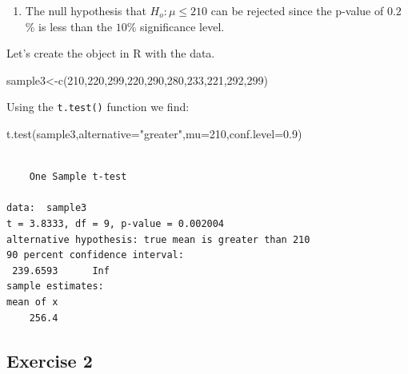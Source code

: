 \documentclass[
  letterpaper,
  DIV=11,
  numbers=noendperiod]{scrreprt}
\newenvironment{Shaded}{\begin{snugshade}}{\end{snugshade}}
\newcommand{\AttributeTok}[1]{\textcolor[rgb]{0.40,0.45,0.13}{#1}}
\newcommand{\DecValTok}[1]{\textcolor[rgb]{0.68,0.00,0.00}{#1}}
\newcommand{\FloatTok}[1]{\textcolor[rgb]{0.68,0.00,0.00}{#1}}
\newcommand{\FunctionTok}[1]{\textcolor[rgb]{0.28,0.35,0.67}{#1}}
\newcommand{\NormalTok}[1]{\textcolor[rgb]{0.00,0.23,0.31}{#1}}
\newcommand{\OtherTok}[1]{\textcolor[rgb]{0.00,0.23,0.31}{#1}}
\newcommand{\StringTok}[1]{\textcolor[rgb]{0.13,0.47,0.30}{#1}}
\providecommand{\tightlist}{%
  \setlength{\itemsep}{0pt}\setlength{\parskip}{0pt}}\usepackage{longtable,booktabs,array}
\begin{document}
\begin{blackbox}

\begin{enumerate}
\def\labelenumi{\arabic{enumi}.}
\setcounter{enumi}{2}
\tightlist
\item
  The null hypothesis that \(H_{o}: \mu \leq 210\) can be rejected since
  the p-value of \(0.2\)\% is less than the \(10\)\% significance level.
\end{enumerate}

\end{blackbox}

Let's create the object in R with the data.

\begin{Shaded}
\begin{Highlighting}[numbers=left,,]
\NormalTok{sample3}\OtherTok{\textless{}{-}}\FunctionTok{c}\NormalTok{(}\DecValTok{210}\NormalTok{,}\DecValTok{220}\NormalTok{,}\DecValTok{299}\NormalTok{,}\DecValTok{220}\NormalTok{,}\DecValTok{290}\NormalTok{,}\DecValTok{280}\NormalTok{,}\DecValTok{233}\NormalTok{,}\DecValTok{221}\NormalTok{,}\DecValTok{292}\NormalTok{,}\DecValTok{299}\NormalTok{)}
\end{Highlighting}
\end{Shaded}

Using the \texttt{t.test()} function we find:

\begin{Shaded}
\begin{Highlighting}[numbers=left,,]
\FunctionTok{t.test}\NormalTok{(sample3,}\AttributeTok{alternative=}\StringTok{"greater"}\NormalTok{,}\AttributeTok{mu=}\DecValTok{210}\NormalTok{,}\AttributeTok{conf.level=}\FloatTok{0.9}\NormalTok{)}
\end{Highlighting}
\end{Shaded}

\begin{verbatim}

    One Sample t-test

data:  sample3
t = 3.8333, df = 9, p-value = 0.002004
alternative hypothesis: true mean is greater than 210
90 percent confidence interval:
 239.6593      Inf
sample estimates:
mean of x 
    256.4 
\end{verbatim}

\hypertarget{exercise-2-25}{%
\subsection*{Exercise 2}\label{exercise-2-25}}
\end{document}
